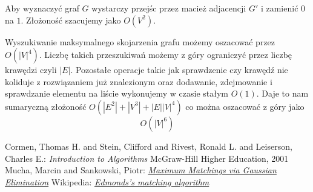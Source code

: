 \documentclass{llncs}
\begin{document}
Aby wyznaczyć graf $G$ wystarczy przejśc przez macież adjacencji $G'$ i zamienić
$0$ na $1$. Złożoność szacujemy jako $O(V^2)$.

 
Wyszukiwanie maksymalnego skojarzenia grafu możemy oszacować przez $O(|V|^4)$\cite{wiki-blossom}.
Liczbę takich przeszukiwań możemy z góry ograniczyć przez liczbę krawędzi czyli $|E|$. 
Pozostałe operacje takie jak sprawdzenie czy krawędź nie koliduje z rozwiązaniem już znalezionym
oraz dodawanie, zdejmowanie i sprawdzanie elementu na liście wykonujemy w czasie stałym $O(1)$.
Daje to nam sumaryczną złożoność $O(|E^2|+|V^3|+|E||V|^4)$ co można oszacować z góry jako 
\begin{equation}
O(|V|^6)
\end{equation}
%
%
\begin{thebibliography}{4}
%
Cormen, Thomas H. and Stein, Clifford and Rivest, Ronald L. and Leiserson, Charles E.:
\textsl{Introduction to Algorithms}
McGraw-Hill Higher Education, 2001
Mucha, Marcin and Sankowski, Piotr:
\textsl{\href{http://www.mimuw.edu.pl/~mucha/pub/mucha_sankowski_focs04.pdf}{Maximum Matchings via Gaussian Elimination}}
Wikipedia:
\textsl{\href{http://en.wikipedia.org/wiki/Blossom_algorithm}{Edmonds's matching algorithm}}
\end{thebibliography}
\end{document}
